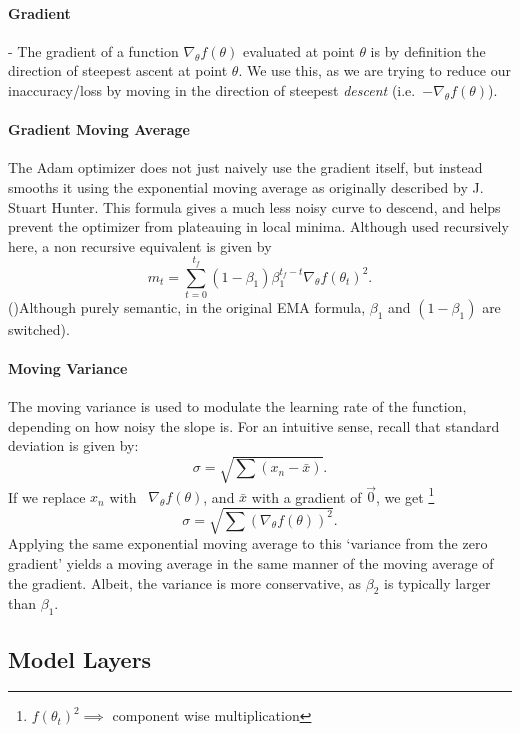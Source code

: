 \documentclass[titlepage,letterpaper]{article}
\begin{document}
\paragraph{Gradient} - The gradient of a function $\nabla_\theta f(\theta)$ evaluated at point $\theta$ is by definition the direction of steepest ascent at point $\theta$. We use this, as we are trying to reduce our inaccuracy/loss by moving in the direction of steepest \textit{descent} \mbox{(i.e. $-\nabla_\theta f(\theta)$)}. 

\paragraph{Gradient Moving Average}

The Adam optimizer does not just naively use the gradient itself, but instead smooths it using the exponential moving average as originally described by J. Stuart Hunter\cite{EMA}. This formula gives a much less noisy curve to descend, and helps prevent the optimizer from plateauing in local minima. Although used recursively here, a non recursive equivalent is given by
\[m_t = \sum_{t=0}^{t_f} \left(1-\beta_1\right) \beta_1^{t_f-t}\nabla_\theta f\left(\theta_{t}\right)^2.\]
()Although purely semantic, in the original EMA formula, \(\beta_1\) and \(\left(1-\beta_1\right)\) are switched).


\paragraph{Moving Variance}
The moving variance is used to modulate the learning rate of the function, depending on how noisy the slope is. For an intuitive sense, recall that standard deviation is given by:
\[\sigma = \sqrt{\sum \left(x_n - \bar{x}\right)}.\]
If we replace \(x_n\) with \ \(\nabla_\theta f(\theta)\), and \(\bar{x}\) with a gradient of \(\vec{0}\), we get \footnote{\(f\left(\theta_{t}\right)^2 \implies \) component wise multiplication}
\[\sigma = \sqrt{\sum \left(\nabla_\theta f(\theta)\right)^2}.\]
Applying the same exponential moving average to this `variance from the zero gradient' yields a moving average in the same manner of the moving average of the gradient. Albeit, the variance is more conservative, as \(\beta_2\) is typically larger than \(\beta_1\).

\subsection{Model Layers}
\end{document}
